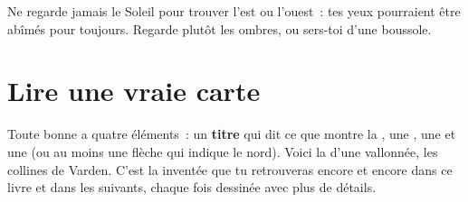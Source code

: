 \begin{safety}
Ne regarde jamais le Soleil pour trouver l'est ou l'ouest~: tes yeux
pourraient être abîmés pour toujours. Regarde plutôt les ombres, ou
sers-toi d'une boussole.
\end{safety}

\section{Lire une vraie carte}

Toute bonne  a quatre éléments~: un \textbf{titre} qui dit ce que
montre la , une \textbf{}, une \textbf{} et une
\textbf{} (ou au moins une flèche qui indique le nord).
Voici la  d'une  vallonnée, les collines de Varden. C'est la
 inventée que tu retrouveras encore et encore dans ce livre et dans
les suivants, chaque fois dessinée avec plus de détails.

